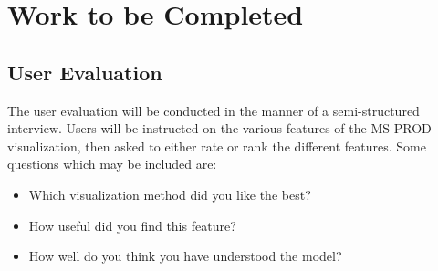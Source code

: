 \chapter{Work to be Completed}


\section{User Evaluation}

The user evaluation will be conducted in the manner of a semi-structured interview.  Users will be instructed on the various features of the MS-PROD visualization, then asked to either rate or rank the different features.  Some questions which may be included are:

\begin{itemize}
  \item Which visualization method did you like the best?
  \item How useful did you find this feature?
  \item How well do you think you have understood the model?
\end{itemize}
